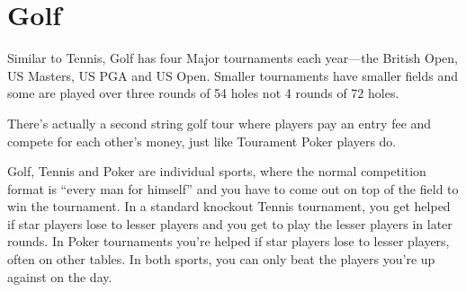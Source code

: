\section{Golf}

Similar to Tennis, Golf has four Major tournaments each
year---the British Open, US Masters, US PGA and US Open. Smaller
tournaments have smaller fields and some are played over
three rounds of 54 holes not 4 rounds of 72 holes.

There's actually a second string golf tour where players pay an
entry fee and compete for each other's money, just like
Tourament Poker players do.

Golf, Tennis and Poker are individual sports, where
the normal competition format is ``every man for himself'' and
you have to come out on top of the field to win the tournament.
In a standard knockout Tennis tournament, you get helped
if star players lose to lesser players and you get to play the
lesser players in later rounds. In Poker tournaments you're
helped if star players lose to lesser players, often on other
tables. In both sports, you can only beat the players you're
up against on the day.
